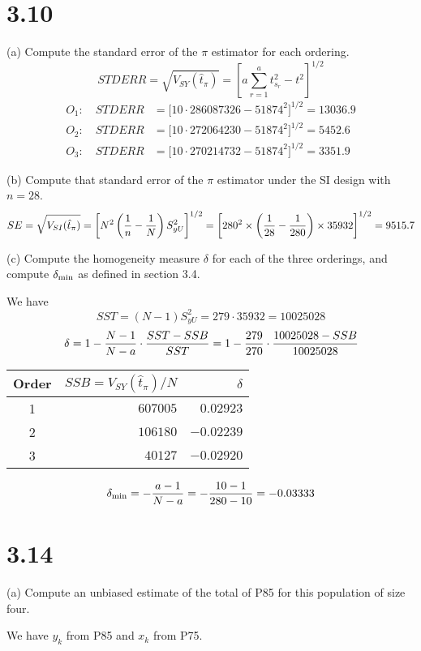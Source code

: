 \documentclass[12pt]{article}
\begin{document}
\section*{3.10}
(a) Compute the standard error of the $\pi$ estimator for each ordering.
\[
STDERR=\sqrt{V_{SY}(\hat t_\pi)}
=
\left[a\sum_{r=1}^at_{s_r}^2-t^2\right]^{1/2}
\]
\begin{align*}
O_1:\quad STDERR&=\big[10\cdot286087326-51874^2\big]^{1/2}=13036.9\\
O_2:\quad STDERR&=\big[10\cdot272064230-51874^2\big]^{1/2}=5452.6\\
O_3:\quad STDERR&=\big[10\cdot270214732-51874^2\big]^{1/2}=3351.9
\end{align*}

\bigskip

(b) Compute that standard error of the $\pi$ estimator under the SI design
with $n=28$.
\[
SE=\sqrt{V_{SI}(\hat t_\pi)}
=\left[N^2\left({1\over n}-{1\over N}\right)S_{yU}^2\right]^{1/2}
=\left[280^2\times\left({1\over28}-{1\over280}\right)\times35932\right]^{1/2}
=9515.7
\]

(c) Compute the homogeneity measure $\delta$ for each of the three orderings,
and compute $\delta_{\rm min}$ as defined in section 3.4.

We have
\[
SST=(N-1)S_{yU}^2=279\cdot35932=10025028
\]
\[
\delta=1-{N-1\over N-a}\cdot{SST-SSB\over SST}
=1-{279\over270}\cdot{10025028-SSB\over10025028}
\]

\begin{center}
\begin{tabular}{|c|r|r|}
\hline
Order & $SSB=V_{SY}(\hat t_\pi)/N$ & $\delta$\\
\hline
1 & $607005$ & $0.02923$\\
2 & $106180$ & $-0.02239$\\
3 & $40127$ & $-0.02920$\\
\hline
\end{tabular}
\end{center}

\[
\delta_{\rm min}=-{a-1\over N-a}=-{10-1\over280-10}=-0.03333
\]


\section*{3.14}
(a) Compute an unbiased estimate of the total of P85 for this population of size four.

We have $y_k$ from P85 and $x_k$ from P75.
\end{document}
